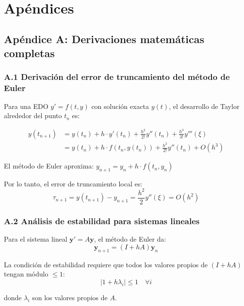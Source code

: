 \documentclass{article}
\begin{document}
\clearpage

\section{Apéndices}

\subsection{Apéndice A\@: Derivaciones matemáticas completas}

\subsubsection{A.1 Derivación del error de truncamiento del método de Euler}

Para una EDO $y' = f(t,y)$ con solución exacta $y(t)$, el desarrollo de Taylor alrededor del punto $t_n$ es:

\begin{align}
y(t_{n+1}) &= y(t_n) + h \cdot y'(t_n) + \frac{h^2}{2!} y''(t_n) + \frac{h^3}{3!} y'''(\xi) \\
&= y(t_n) + h \cdot f(t_n, y(t_n)) + \frac{h^2}{2!} y''(t_n) + O(h^3)
\end{align}

El método de Euler aproxima: $y_{n+1} = y_n + h \cdot f(t_n, y_n)$

Por lo tanto, el error de truncamiento local es:
\begin{equation}
\tau_{n+1} = y(t_{n+1}) - y_{n+1} = \frac{h^2}{2} y''(\xi) = O(h^2)
\end{equation}

\subsubsection{A.2 Análisis de estabilidad para sistemas lineales}

Para el sistema lineal $\mathbf{y}' = A\mathbf{y}$, el método de Euler da:
\begin{equation}
\mathbf{y}_{n+1} = (I + hA)\mathbf{y}_n
\end{equation}

La condición de estabilidad requiere que todos los valores propios de $(I + hA)$ tengan módulo $\leq 1$:
\begin{equation}
|1 + h\lambda_i| \leq 1 \quad \forall i
\end{equation}

donde $\lambda_i$ son los valores propios de $A$.
\end{document}
